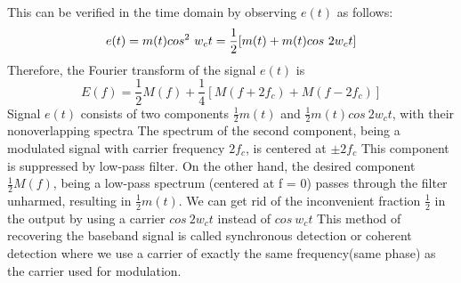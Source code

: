 This can be verified in the time domain by observing $e(t)$
as follows:
\begin{equation}
  e(t) = m(t)cos^2~w_ct\\
      = \frac{1}{2}[m(t)+m(t)cos~2w_ct]
\end{equation}
Therefore, the Fourier transform of the signal $e(t)$ is
\begin{equation}
   E(f) = \frac{1}{2}M(f) + \frac{1}{4}[M(f +2f_c)+M(f-2f_c)]
\end{equation}
Signal $e(t)$ consists of two components $\frac{1}{2}m(t)$ and $\frac{1}{2}m(t)cos~2w_ct$, with their nonoverlapping spectra
The spectrum of the second component, being a
modulated signal with carrier frequency $2f_c$, is centered at $\pm 2f_c$
This component is suppressed by low-pass filter. On the other hand, the desired component $\frac{1}{2}M(f)$, being a low-pass spectrum (centered at f = 0) passes through the filter unharmed, resulting in $\frac{1}{2}m(t)$. We can get rid  of the inconvenient fraction $\frac{1}{2}$ in the output by using a carrier $cos~2w_ct$ instead of $cos~w_ct$
This method of recovering the baseband signal is called synchronous detection or coherent detection where we
use a carrier of exactly the same frequency(same phase) as the carrier used for modulation.
